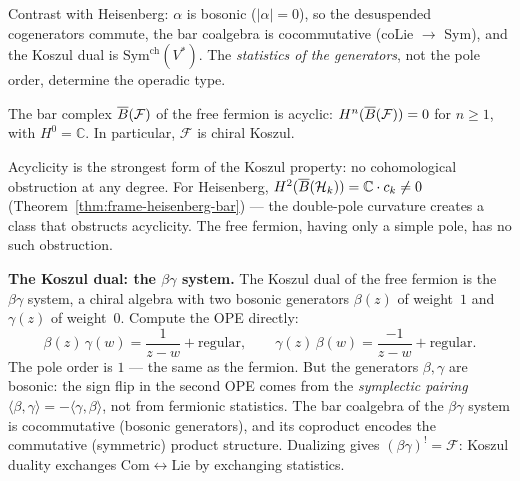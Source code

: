 Contrast with Heisenberg: $\alpha$ is bosonic ($|\alpha| = 0$),
so the desuspended cogenerators commute, the bar coalgebra
is cocommutative (coLie $\to$ Sym), and the Koszul dual is
$\mathrm{Sym}^{\mathrm{ch}}(V^*)$.  The
\emph{statistics of the generators}, not the pole order,
determine the operadic type.

\begin{theorem}
\label{thm:frame-fermion-bar}
The bar complex $\overline{B}(\mathcal{F})$ of the free fermion is acyclic:
$H^n(\overline{B}(\mathcal{F})) = 0$ for $n \geq 1$, with
$H^0 = \mathbb{C}$.  In particular, $\mathcal{F}$ is chiral Koszul.
\end{theorem}

Acyclicity is the strongest form of the Koszul property: no
cohomological obstruction at any degree.  For Heisenberg,
$H^2(\overline{B}(\mathcal{H}_k)) = \mathbb{C} \cdot c_k \neq 0$
(Theorem~\ref{thm:frame-heisenberg-bar}) --- the double-pole
curvature creates a class that obstructs acyclicity.  The free
fermion, having only a simple pole, has no such obstruction.

\medskip
\noindent\textbf{The Koszul dual: the $\beta\gamma$ system.}
The Koszul dual of the free fermion is the $\beta\gamma$ system,
a chiral algebra with two bosonic generators $\beta(z)$ of
weight~$1$ and $\gamma(z)$ of weight~$0$.  Compute the OPE
directly:
\begin{equation}\label{eq:frame-betagamma-ope}
\beta(z)\,\gamma(w) = \frac{1}{z-w} + \text{regular},
\qquad
\gamma(z)\,\beta(w) = \frac{-1}{z-w} + \text{regular}.
\end{equation}
The pole order is $1$ --- the same as the fermion.  But the
generators $\beta, \gamma$ are bosonic: the sign flip in the
second OPE comes from the \emph{symplectic pairing}
$\langle \beta, \gamma \rangle = -\langle \gamma, \beta \rangle$,
not from fermionic statistics.  The bar coalgebra of the
$\beta\gamma$ system is cocommutative (bosonic generators),
and its coproduct encodes the commutative (symmetric) product
structure.  Dualizing gives $(\beta\gamma)^! = \mathcal{F}$:
Koszul duality exchanges
$\mathrm{Com} \leftrightarrow \mathrm{Lie}$
by exchanging statistics.

